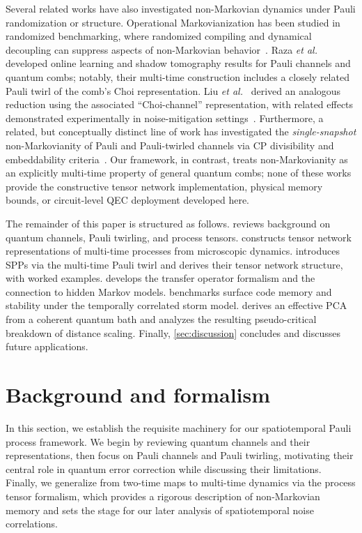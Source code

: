 \documentclass[
    aps,
    prx,
    reprint,
    superscriptaddress,
    longbibliography,
    nofootinbib,
    floatfix,
]{revtex4-2}
\begin{document}
Several related works have also investigated non-Markovian dynamics under Pauli randomization or structure. Operational Markovianization has been studied in randomized benchmarking, where randomized compiling and dynamical decoupling can suppress aspects of non-Markovian behavior~\cite{figueroa-romeroOperationalMarkovianizationRandomized2024}. Raza \emph{et al.}~\cite{razaOnlineLearningQuantum2024} developed online learning and shadow tomography results for Pauli channels and quantum combs; notably, their multi-time construction includes a closely related Pauli twirl of the comb's Choi representation. Liu \emph{et al.}~\cite{liuNonMarkovianNoiseSuppression2024} derived an analogous reduction using the associated ``Choi-channel'' representation, with related effects demonstrated experimentally in noise-mitigation settings~\cite{liuRealizingUniversalNonMarkovian2025}. Furthermore, a related, but conceptually distinct line of work has investigated the \emph{single-snapshot} non-Markovianity of Pauli and Pauli-twirled channels via CP divisibility and embeddability criteria~\cite{kattemolleNonMarkovianityInducedPaulitwirling2026,seifSingleSnapshotNonMarkovianity2026}. Our framework, in contrast, treats non-Markovianity as an explicitly multi-time property of general quantum combs; none of these works provide the constructive tensor network implementation, physical memory bounds, or circuit-level QEC deployment developed here.

The remainder of this paper is structured as follows.  reviews background on quantum channels, Pauli twirling, and process tensors.  constructs tensor network representations of multi-time processes from microscopic dynamics.  introduces SPPs via the multi-time Pauli twirl and derives their tensor network structure, with worked examples.  develops the transfer operator formalism and the connection to hidden Markov models.  benchmarks surface code memory and stability under the temporally correlated storm model.  derives an effective PCA from a coherent quantum bath and analyzes the resulting pseudo-critical breakdown of distance scaling. Finally, \cref{sec:discussion} concludes and discusses future applications.

\section{Background and formalism}\label{sec:background}
In this section, we establish the requisite machinery for our spatiotemporal Pauli process framework. We begin by reviewing quantum channels and their representations, then focus on Pauli channels and Pauli twirling, motivating their central role in quantum error correction while discussing their limitations. Finally, we generalize from two-time maps to multi-time dynamics via the process tensor formalism, which provides a rigorous description of non-Markovian memory and sets the stage for our later analysis of spatiotemporal noise correlations.
\end{document}
